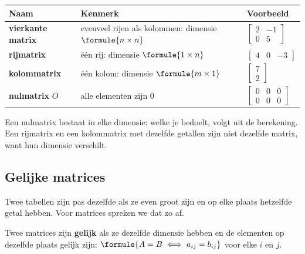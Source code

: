 \begin{theorie}
{\centering{}\renewcommand{\arraystretch}{1.5}%
\begin{tabular}{|>{\centering\arraybackslash}m{2.8cm}|>{\centering\arraybackslash}m{5.6cm}|>{\centering\arraybackslash}m{4.4cm}|}
\hline
\textbf{Naam} & \textbf{Kenmerk} & \textbf{Voorbeeld} \\ \hline
\textbf{\textcolor{accent}{vierkante matrix}} & evenveel rijen als kolommen: dimensie $\formule{n \times n}$ & $\begin{bmatrix} 2 & -1 \\ 0 & 5 \end{bmatrix}$ \\[4mm] \hline
\textbf{\textcolor{accent}{rijmatrix}} & één rij: dimensie $\formule{1 \times n}$ & $\begin{bmatrix} 4 & 0 & -3 \end{bmatrix}$ \\[2mm] \hline
\textbf{\textcolor{accent}{kolommatrix}} & één kolom: dimensie $\formule{m \times 1}$ & $\begin{bmatrix} 7 \\ 2 \end{bmatrix}$ \\[4mm] \hline
\textbf{\textcolor{accent}{nulmatrix}} $O$ & alle elementen zijn 0 & $\begin{bmatrix} 0 & 0 & 0 \\ 0 & 0 & 0 \end{bmatrix}$ \\[4mm] \hline
\end{tabular}\par}
\end{theorie}

Een nulmatrix bestaat in elke dimensie: welke je bedoelt, volgt uit de berekening. Een rijmatrix en een kolommatrix met dezelfde getallen zijn niet dezelfde matrix, want hun dimensie verschilt.

\subsection{Gelijke matrices}

Twee tabellen zijn pas dezelfde als ze even groot zijn en op elke plaats hetzelfde getal hebben. Voor matrices spreken we dat zo af.

\begin{theorie}
Twee matrices zijn \textbf{\textcolor{accent}{gelijk}} als ze dezelfde dimensie hebben en de elementen op dezelfde plaats gelijk zijn: \quad $\formule{A = B \iff a_{ij} = b_{ij}}$ voor elke $i$ en $j$.
\end{theorie}

